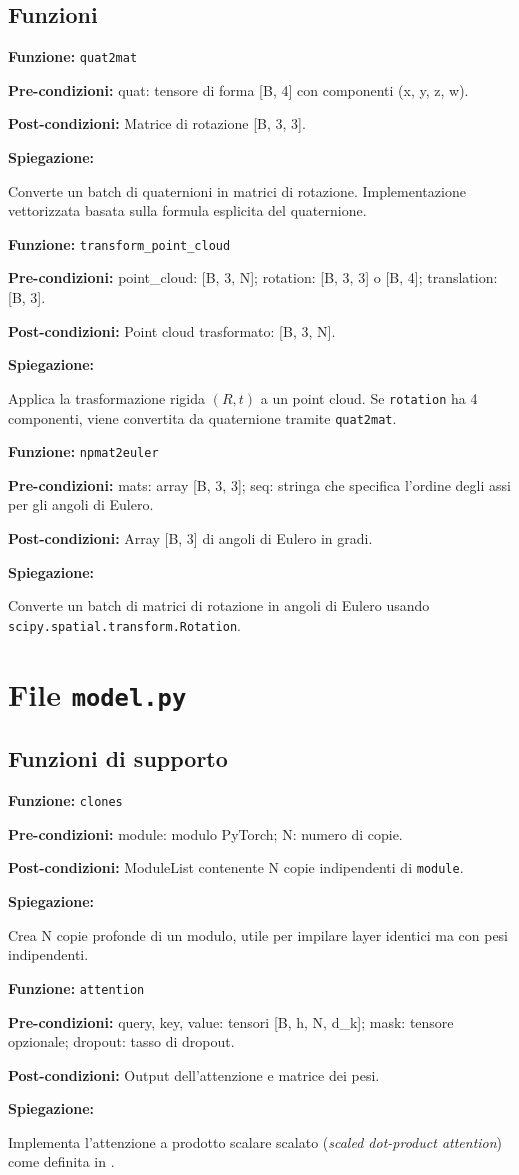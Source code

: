 \documentclass[11pt,a4paper]{article}
\newenvironment{functionspec}[3]{%
    \par\medskip\noindent
    \textbf{Funzione:} \texttt{#1}\par
    \textbf{Pre-condizioni:} #2\par
    \textbf{Post-condizioni:} #3\par
    \textbf{Spiegazione:}\par\noindent\ignorespaces
}{%
    \par\medskip
}
\begin{document}
\subsection{Funzioni}

\begin{functionspec}{quat2mat}{quat: tensore di forma [B, 4] con componenti (x, y, z, w).}{Matrice di rotazione [B, 3, 3].}
Converte un batch di quaternioni in matrici di rotazione. Implementazione vettorizzata basata sulla formula esplicita del quaternione.
\end{functionspec}

\begin{functionspec}{transform\_point\_cloud}{point\_cloud: [B, 3, N]; rotation: [B, 3, 3] o [B, 4]; translation: [B, 3].}{Point cloud trasformato: [B, 3, N].}
Applica la trasformazione rigida \((R, t)\) a un point cloud. Se \texttt{rotation} ha 4 componenti, viene convertita da quaternione tramite \texttt{quat2mat}.
\end{functionspec}

\begin{functionspec}{npmat2euler}{mats: array [B, 3, 3]; seq: stringa che specifica l'ordine degli assi per gli angoli di Eulero.}{Array [B, 3] di angoli di Eulero in gradi.}
Converte un batch di matrici di rotazione in angoli di Eulero usando \texttt{scipy.spatial.transform.Rotation}.
\end{functionspec}

\section{File \texttt{model.py}}

\subsection{Funzioni di supporto}

\begin{functionspec}{clones}{module: modulo PyTorch; N: numero di copie.}{ModuleList contenente N copie indipendenti di \texttt{module}.}
Crea N copie profonde di un modulo, utile per impilare layer identici ma con pesi indipendenti.
\end{functionspec}

\begin{functionspec}{attention}{query, key, value: tensori [B, h, N, d\_k]; mask: tensore opzionale; dropout: tasso di dropout.}{Output dell'attenzione e matrice dei pesi.}
Implementa l'attenzione a prodotto scalare scalato (\textit{scaled dot-product attention}) come definita in \cite{vaswani2017attention}.
\end{functionspec}
\end{document}

